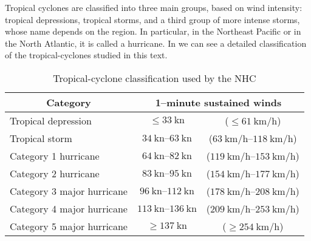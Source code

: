\bigskip
Tropical cyclones are classified into three main groups, based on wind intensity: tropical depressions, tropical storms, and a third group of more intense storms, whose name depends on the region. In particular, in the Northeast Pacific or in the North Atlantic, it is called a hurricane. In  we can see a detailed classification of the tropical-cyclones studied in this text.
\begin{table}[H]
	\centering
	\begin{tabular}{l c c}
		\toprule
		\toprule
		\multicolumn{1}{c}{Category} & \multicolumn{2}{c}{1--minute sustained winds} \\
		\midrule
		Tropical depression  & $\le \SI{33}{\knot}$      & ($\le \SI{61}{\km/\hour}$) \\
		Tropical storm       & $\SIrange{34}{63}{\knot}$ & ($\SIrange{63}{118}{\km/\hour}$) \\
		Category 1 hurricane & $\SIrange{64}{82}{\knot}$ & ($\SIrange{119}{153}{\km/\hour}$) \\
		Category 2 hurricane & $\SIrange{83}{95}{\knot}$ & ($\SIrange{154}{177}{\km/\hour}$) \\
		Category 3 major hurricane & $\SIrange{96}{112}{\knot}$  & ($\SIrange{178}{208}{\km/\hour}$) \\
		Category 4 major hurricane & $\SIrange{113}{136}{\knot}$ & ($\SIrange{209}{253}{\km/\hour}$) \\
		Category 5 major hurricane & $\ge \SI{137}{\knot}$       & ($\ge \SI{254}{\km/\hour}$) \\
		\bottomrule
	\end{tabular}
	\caption{Tropical-cyclone classification used by the NHC}
	\label{tab:hurr-class}
\end{table}
